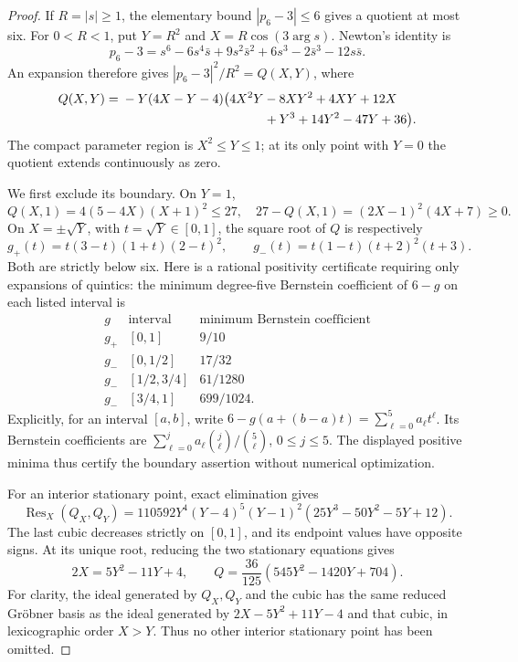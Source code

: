 \documentclass[UTF8,11pt]{ctexart}
\theoremstyle{definition}
\numberwithin{equation}{section}
\begin{document}
\begin{proof}
If $R=|s|\ge1$, the elementary bound $|p_6-3|\le6$ gives a
quotient at most six. For $0<R<1$, put
$Y=R^2$ and $X=R\cos(3\arg s)$. Newton's identity is
\[
 p_6-3=s^6-6s^4\bar s+9s^2\bar s^2
             +6s^3-2\bar s^3-12s\bar s.
\]
An expansion therefore gives $|p_6-3|^2/R^2=Q(X,Y)$, where
\begin{align}
 Q(X,Y)={}&-Y(4X-Y-4)\bigl(4X^2Y-8XY^2+4XY+12X\notag\\
                       &\hspace{39mm}+Y^3+14Y^2-47Y+36\bigr).
                                      \label{v24:eq:objective}
\end{align}
The compact parameter region is $X^2\le Y\le1$; at its only
point with $Y=0$ the quotient extends continuously as zero.

We first exclude its boundary. On $Y=1$,
\[
 Q(X,1)=4(5-4X)(X+1)^2\le27,
 \quad 27-Q(X,1)=(2X-1)^2(4X+7)\ge0.
\]
On $X=\pm\sqrt Y$, with $t=\sqrt Y\in[0,1]$, the square
root of $Q$ is respectively
\[
 g_+(t)=t(3-t)(1+t)(2-t)^2,\qquad
 g_-(t)=t(1-t)(t+2)^2(t+3).
\]
Both are strictly below six. Here is a rational positivity
certificate requiring only expansions of quintics: the minimum
degree-five Bernstein coefficient of $6-g$ on each listed interval is
\[
\begin{array}{c|c|c}
g&\text{interval}&\text{minimum Bernstein coefficient}\\ \hline
g_+&[0,1]&9/10\\
g_-&[0,1/2]&17/32\\
g_-&[1/2,3/4]&61/1280\\
g_-&[3/4,1]&699/1024.
\end{array}
\]
Explicitly, for an interval $[a,b]$, write
$6-g(a+(b-a)t)=\sum_{\ell=0}^5 a_\ell t^\ell$.
Its Bernstein coefficients are
$\sum_{\ell=0}^j a_\ell\binom j\ell/\binom5\ell$,
$0\le j\le5$. The displayed positive minima thus certify the
boundary assertion without numerical optimization.

For an interior stationary point, exact elimination gives
\begin{equation}\label{v24:eq:resultant}
 \operatorname{Res}_X(Q_X,Q_Y)
 =110592Y^4(Y-4)^5(Y-1)^2
                    (25Y^3-50Y^2-5Y+12).
\end{equation}
The last cubic decreases strictly on $[0,1]$, and its endpoint
values have opposite signs. At its unique root, reducing the
two stationary equations gives
\[
 2X=5Y^2-11Y+4,\qquad
 Q=\frac{36}{125}(545Y^2-1420Y+704).
\]
For clarity, the ideal generated by $Q_X,Q_Y$ and the cubic has
the same reduced Gr\"obner basis as the ideal generated by
$2X-5Y^2+11Y-4$ and that cubic, in lexicographic order $X>Y$.
Thus no other interior stationary point has been omitted.


\end{proof}
\end{document}
